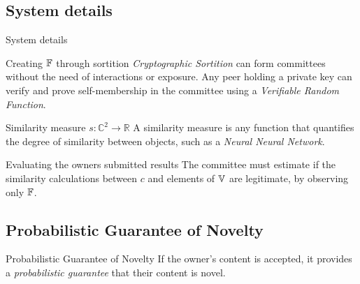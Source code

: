 \documentclass{beamer}
\begin{document}
\subsection{System details}
\begin{frame}{System details}
    \begin{block}{Creating ${\mathbb{F}}$ through sortition}
        \emph{Cryptographic Sortition} can form committees without the need of interactions or exposure. Any peer holding a private key can verify and prove self-membership in the committee using a \emph{Verifiable Random Function}.
    \end{block}\pause
    \vfill
    \begin{block}{Similarity measure $s \colon \mathbb{C}^2 \rightarrow \mathbb{R}$}
        A similarity measure is any function that quantifies the degree of similarity between objects, such as a \emph{Neural Neural Network}.
    \end{block}\pause
    \vfill
    \begin{block}{Evaluating the owners submitted results}
        The committee must estimate if the similarity calculations between $c$ and elements of ${\mathbb{V}}$ are legitimate, by observing only ${\mathbb{F}}$.
    \end{block}
\end{frame}

\subsection{Probabilistic Guarantee of Novelty}
\begin{frame}{Probabilistic Guarantee of Novelty}
    If the owner's content is accepted, it provides a \emph{probabilistic guarantee} that their content is novel.
\end{frame}

\end{document}
